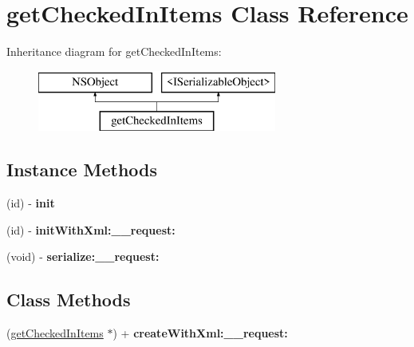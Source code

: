 \hypertarget{interfaceget_checked_in_items}{}\section{get\+Checked\+In\+Items Class Reference}
\label{interfaceget_checked_in_items}
Inheritance diagram for get\+Checked\+In\+Items\+:\begin{figure}[H]
\begin{center}
\leavevmode
\includegraphics[height=2.000000cm]{interfaceget_checked_in_items}
\end{center}
\end{figure}
\subsection*{Instance Methods}
\begin{DoxyCompactItemize}
\item 
\hypertarget{interfaceget_checked_in_items_abdd741162d6a0060fa320f4e4c687d04}{}(id) -\/ {\bfseries init}\label{interfaceget_checked_in_items_abdd741162d6a0060fa320f4e4c687d04}

\item 
\hypertarget{interfaceget_checked_in_items_a8b8a05e4228b033114567a4d89de18a8}{}(id) -\/ {\bfseries init\+With\+Xml\+:\+\_\+\+\_\+request\+:}\label{interfaceget_checked_in_items_a8b8a05e4228b033114567a4d89de18a8}

\item 
\hypertarget{interfaceget_checked_in_items_a52460715ad5ff8d03518acac0f2b8f94}{}(void) -\/ {\bfseries serialize\+:\+\_\+\+\_\+request\+:}\label{interfaceget_checked_in_items_a52460715ad5ff8d03518acac0f2b8f94}

\end{DoxyCompactItemize}
\subsection*{Class Methods}
\begin{DoxyCompactItemize}
\item 
\hypertarget{interfaceget_checked_in_items_a44b5bbbf95ac564e0a72661a6a0edd78}{}(\hyperlink{interfaceget_checked_in_items}{get\+Checked\+In\+Items} $\ast$) + {\bfseries create\+With\+Xml\+:\+\_\+\+\_\+request\+:}\label{interfaceget_checked_in_items_a44b5bbbf95ac564e0a72661a6a0edd78}

\end{DoxyCompactItemize}
